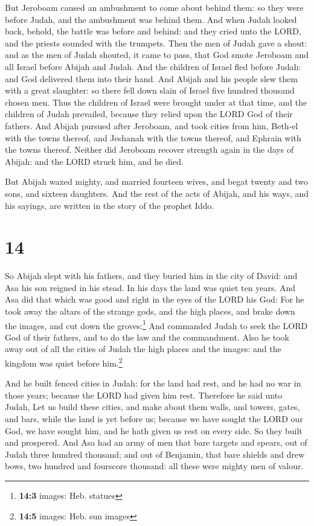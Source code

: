  But Jeroboam caused an ambushment to come about behind
them: so they were before Judah, and the ambushment was behind them.
 And when Judah looked back, behold, the battle was
before and behind: and they cried unto the LORD, and the priests sounded
with the trumpets.  Then the men of Judah gave a shout:
and as the men of Judah shouted, it came to pass, that God smote
Jeroboam and all Israel before Abijah and Judah.  And the
children of Israel fled before Judah: and God delivered them into their
hand.  And Abijah and his people slew them with a great
slaughter: so there fell down slain of Israel five hundred thousand
chosen men.  Thus the children of Israel were brought
under at that time, and the children of Judah prevailed, because they
relied upon the LORD God of their fathers.  And Abijah
pursued after Jeroboam, and took cities from him, Beth-el with the towns
thereof, and Jeshanah with the towns thereof, and Ephrain with the towns
thereof.  Neither did Jeroboam recover strength again in
the days of Abijah: and the LORD struck him, and he died.

 But Abijah waxed mighty, and married fourteen wives, and
begat twenty and two sons, and sixteen daughters.  And
the rest of the acts of Abijah, and his ways, and his sayings, are
written in the story of the prophet Iddo.

\hypertarget{section-13}{%
\section{14}\label{section-13}}

 So Abijah slept with his fathers, and they buried him in
the city of David: and Asa his son reigned in his stead. In his days the
land was quiet ten years.  And Asa did that which was good
and right in the eyes of the LORD his God:  For he took
away the altars of the strange gods, and the high places, and brake down
the images, and cut down the groves:\footnote{\textbf{14:3} images: Heb.
  statues}  And commanded Judah to seek the LORD God of
their fathers, and to do the law and the commandment. 
Also he took away out of all the cities of Judah the high places and the
images: and the kingdom was quiet before him.\footnote{\textbf{14:5}
  images: Heb. sun images}

 And he built fenced cities in Judah: for the land had
rest, and he had no war in those years; because the LORD had given him
rest.  Therefore he said unto Judah, Let us build these
cities, and make about them walls, and towers, gates, and bars, while
the land is yet before us; because we have sought the LORD our God, we
have sought him, and he hath given us rest on every side. So they built
and prospered.  And Asa had an army of men that bare
targets and spears, out of Judah three hundred thousand; and out of
Benjamin, that bare shields and drew bows, two hundred and fourscore
thousand: all these were mighty men of valour.

